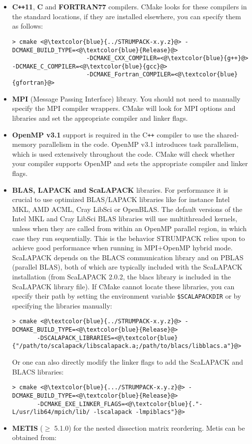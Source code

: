 \documentclass{article}
\newcommand{\tm}{\textsuperscript{\textregistered}}
\begin{document}
\begin{itemize}
\item \textbf{C\texttt{++}11}, \textbf{C} and \textbf{FORTRAN77}
  compilers. CMake looks for these compilers in the standard
  locations, if they are installed elsewhere, you can specify them as
  follows:
  \begin{lstlisting}[style=Bash]
    > cmake <@\textcolor{blue}{../STRUMPACK-x.y.z}@> -DCMAKE_BUILD_TYPE=<@\textcolor{blue}{Release}@>
                     -DCMAKE_CXX_COMPILER=<@\textcolor{blue}{g++}@> -DCMAKE_C_COMPILER=<@\textcolor{blue}{gcc}@>
                     -DCMAKE_Fortran_COMPILER=<@\textcolor{blue}{gfortran}@>
  \end{lstlisting}
\item \textbf{MPI} (Message Passing Interface) library.  You should
  not need to manually specify the MPI compiler wrappers.  CMake will
  look for MPI options and libraries and set the appropriate compiler
  and linker flags.
\item \textbf{OpenMP v3.1} support is required in the C\texttt{++}
  compiler to use the shared-memory parallelism in the code. OpenMP
  v3.1 introduces task parallelism, which is used extensively
  throughout the code. CMake will check whether your compiler supports
  OpenMP and sets the appropriate compiler and linker flags.
\item \textbf{BLAS, LAPACK and ScaLAPACK} libraries. For performance
  it is crucial to use optimized BLAS/LAPACK libraries like for
  instance Intel\tm{} MKL, AMD\tm{} ACML, Cray\tm{} LibSci or
  OpenBLAS. The default versions of the Intel\tm{} MKL and Cray\tm{}
  LibSci BLAS libraries will use multithreaded kernels, unless when
  they are called from within an OpenMP parallel region, in which case
  they run sequentially. This is the behavior STRUMPACK relies upon to
  achieve good performance when running in MPI+OpenMP hybrid
  mode. ScaLAPACK depends on the BLACS communication library and on
  PBLAS (parallel BLAS), both of which are typically included with the
  ScaLAPACK installation (from ScaLAPACK 2.0.2, the blacs library is
  included in the ScaLAPACK library file). If CMake cannot locate
  these libraries, you can specify their path by setting the
  environment variable
  \lstinline[style=Bash]!$SCALAPACKDIR! or by specifying the libraries
  manually:
  \begin{lstlisting}[style=Bash]
    > cmake <@\textcolor{blue}{../STRUMPACK-x.y.z}@> -DCMAKE_BUILD_TYPE=<@\textcolor{blue}{Release}@>
       -DSCALAPACK_LIBRARIES=<@\textcolor{blue}{"/path/to/scalapack/libscalapack.a;/path/to/blacs/libblacs.a"}@>
  \end{lstlisting}
  Or one can also directly modify the linker flags to add the
  ScaLAPACK and BLACS libraries:
  \begin{lstlisting}[style=Bash]
    > cmake <@\textcolor{blue}{.../STRUMPACK-x.y.z}@> -DCMAKE_BUILD_TYPE=<@\textcolor{blue}{Release}@>
       -DCMAKE_EXE_LINKER_FLAGS=<@\textcolor{blue}{."-L/usr/lib64/mpich/lib/ -lscalapack -lmpiblacs"}@>
  \end{lstlisting}
\item \textbf{METIS} ($\geq$ 5.1.0) for the nested dissection matrix
  reordering. Metis can be obtained from:


\end{itemize}
\end{document}
